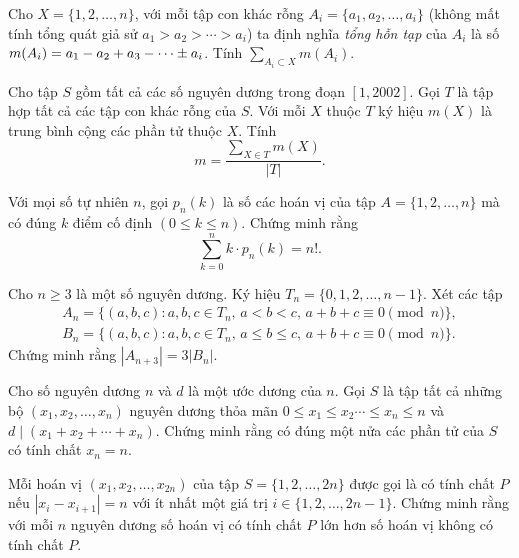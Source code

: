 \begin{bt}%
	Cho $X=\{1,2,\ldots,n\}$, với mỗi tập con khác rỗng $A_i=\{a_1,a_2,\ldots,a_i\}$ (không mất tính tổng quát giả sử $a_1>a_2>\cdots>a_i$) ta định nghĩa \textit{tổng hỗn tạp} của $A_i$ là số $\break m(A_i)=a_1-a_2+a_3-\cdots\pm a_i$. Tính $\sum\limits_{A_i\subset X}m(A_i)$. 
\end{bt}

\begin{bt}%
	Cho tập $S$ gồm tất cả các số nguyên dương trong đoạn $[1,2002]$. Gọi $T$ là tập hợp tất cả các tập con khác rỗng của $S$. Với mỗi $X$ thuộc $T$ ký hiệu $m(X)$ là trung bình cộng các phần tử thuộc $X$. Tính $$m=\dfrac{\sum_{X\in T}m(X)}{|T|}.$$
\end{bt}

\begin{bt}%
	Với mọi số tự nhiên $n$, gọi $p_n(k)$ là số các hoán vị của tập $A=\{1,2,\ldots,n\}$ mà có đúng $k$ điểm cố định $(0\leq k\leq n)$. Chứng minh rằng $$\sum^n_{k=0}k\cdot p_n(k)=n!.$$
\end{bt}

\begin{bt}%
	Cho $n\geq 3$ là một số nguyên dương. Ký hiệu $T_n=\{0,1,2,\ldots, n-1\}$. Xét các tập 
	\begin{gather*}
	A_n=\{(a,b,c):a,b,c\in T_n,\, a<b<c,\, a+b+c\equiv 0\pmod{n}\},\\
	B_n=\{(a,b,c): a,b,c \in T_n,\, a\leq b\leq c , \, a+b+c \equiv 0 \pmod{n}\}.
	\end{gather*}
	Chứng minh rằng $|A_{n+3}|=3|B_n|$.
\end{bt}

\begin{bt}%
	Cho số nguyên dương $n$ và $d$ là một ước dương của $n$. Gọi $S$ là tập tất cả những bộ $(x_1,x_2,\ldots,x_n)$ nguyên dương thỏa mãn $0\leq x_1\leq x_2\cdots\leq x_n\leq n$ và $d\mid (x_1+x_2+\cdots + x_n)$. Chứng minh rằng có đúng một nửa các phần tử của $S$ có tính chất $x_n=n$.
\end{bt}

\begin{bt}%
	Mỗi hoán vị $(x_1, x_2,\ldots,x_{2n})$ của tập $S=\{1,2,\ldots,2n\}$ được gọi là có tính chất $P$ nếu $|x_i-x_{i+1}|=n$ với ít nhất một giá trị $i\in \{1,2,\ldots, 2n-1\}$. Chứng minh rằng với mỗi $n$ nguyên dương số hoán vị có tính chất $P$ lớn hơn số hoán vị không có tính chất $P$.
\end{bt}




